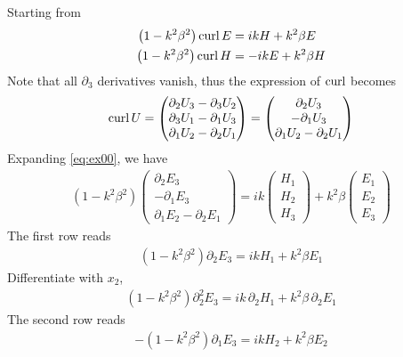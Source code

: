 Starting from
\begin{align}
  \left(1-k^2\beta^2\right)\operatorname{curl} E &= ikH + k^2\beta E \label{eq:ex00}\\
  \left(1-k^2\beta^2\right)\operatorname{curl} H &= -ikE + k^2\beta H\label{eq:ex01}
\end{align}
Note that all $\partial_3$ derivatives vanish, thus the expression of $\operatorname{curl}$ becomes
\begin{align*}
  \operatorname{curl} U = \begin{pmatrix}
    \partial_2 U_3-\partial_3 U_2 \\
    \partial_3 U_1-\partial_1 U_3 \\
    \partial_1 U_2-\partial_2 U_1 \\
  \end{pmatrix} 
  = \begin{pmatrix}
    \partial_2 U_3 \\
    -\partial_1 U_3 \\
    \partial_1 U_2-\partial_2 U_1 \\
  \end{pmatrix} 
\end{align*}
Expanding \eqref{eq:ex00}, we have
\begin{align*}
  \left(1-k^2\beta^2\right)\begin{pmatrix}\partial_2 E_3\\ -\partial_1 E_3 \\ \partial_1 E_2 -\partial_2 E_1\end{pmatrix} = ik\begin{pmatrix}H_1\\H_2\\H_3\end{pmatrix} + k^2\beta\begin{pmatrix}E_1\\E_2\\E_3\end{pmatrix}
\end{align*}
The first row reads
\begin{align*}
  \left(1-k^2\beta^2\right)\partial_2 E_3 = ik H_1 + k^2\beta E_1
\end{align*}
Differentiate with $x_2$,
\begin{align}\label{eq:he00}
  \left(1-k^2\beta^2\right)\partial_2^2 E_3 = ik \,\partial_2 H_1 + k^2\beta\,\partial_2 E_1
\end{align}
The second row reads
\begin{align*}
  -\left(1-k^2\beta^2\right)\partial_1 E_3 = ik H_2 + k^2\beta E_2
\end{align*}
